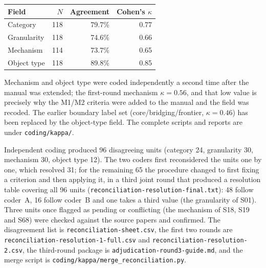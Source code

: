 \documentclass[11pt,a4paper]{article}
\begin{document}
\begin{center}
\begin{tabular}{lrrr}
\toprule
Field & $N$ & Agreement & Cohen's $\kappa$ \\
\midrule
Category & 118 & 79.7\% & 0.77 \\
Granularity & 118 & 74.6\% & 0.66 \\
Mechanism & 114 & 73.7\% & 0.65 \\
Object type & 118 & 89.8\% & 0.85 \\
\bottomrule
\end{tabular}
\end{center}

Mechanism and object type were coded independently a second time after the manual was extended; the first-round mechanism $\kappa=0.56$, and that low value is precisely why the M1/M2 criteria were added to the manual and the field was recoded. The earlier boundary label set (core/bridging/frontier, $\kappa=0.46$) has been replaced by the object-type field. The complete scripts and reports are under \texttt{coding/kappa/}.

Independent coding produced 96 disagreeing units (category 24, granularity 30, mechanism 30, object type 12). The two coders first reconsidered the units one by one, which resolved 31; for the remaining 65 the procedure changed to first fixing a criterion and then applying it, in a third joint round that produced a resolution table covering all 96 units (\texttt{reconciliation-resolution-final.txt}): 48 follow coder~A, 16 follow coder~B and one takes a third value (the granularity of S01). Three units once flagged as pending or conflicting (the mechanism of S18, S19 and S68) were checked against the source papers and confirmed. The disagreement list is \texttt{reconciliation-sheet.csv}, the first two rounds are \texttt{reconciliation-resolution-1-full.csv} and \texttt{reconciliation-resolution-2.csv}, the third-round package is \texttt{adjudication-round3-guide.md}, and the merge script is \texttt{coding/kappa/merge\_reconciliation.py}.
\end{document}
